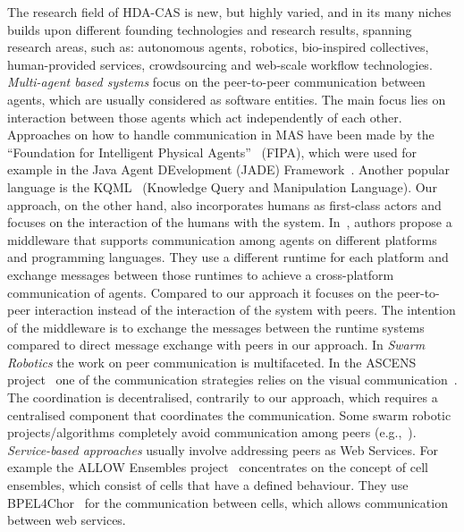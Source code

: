 \documentclass{llncs}
\begin{document}
  The research field of HDA-CAS is new, but highly varied, and in its many niches builds upon different founding technologies and research results, spanning research areas, such as: autonomous agents, robotics, bio-inspired collectives, human-provided services, crowdsourcing and web-scale workflow technologies. 
  \emph{Multi-agent based systems} focus on the peer-to-peer communication between agents, which are usually considered as software entities. The main focus lies on interaction between those agents which act independently of each other. Approaches on how to handle communication in MAS have been made by the ``Foundation for Intelligent Physical Agents''~\cite{FIPA} (FIPA), which were used for example in the Java Agent DEvelopment (JADE) Framework~\cite{JADE}. Another popular language is the KQML~\cite{KQML} (Knowledge Query and Manipulation Language). 
  Our approach, on the other hand, also incorporates humans as first-class actors and focuses on the interaction of the humans with the system. 
  In~\cite{Cabri1}, authors propose a middleware that supports communication among agents on different platforms and programming languages. They use a different runtime for each platform and exchange messages between those runtimes to achieve a cross-platform communication of agents. Compared to our approach it focuses on the peer-to-peer interaction instead of the interaction of the system with peers. The intention of the middleware is to exchange the messages between the runtime systems compared to direct message exchange with peers in our approach.
  In \emph{Swarm Robotics} the work on peer communication is multifaceted. In the ASCENS project~\cite{Zambonelli} one of the communication strategies relies on the visual communication~\cite{VisualComm}. The coordination is decentralised, contrarily to our approach, which requires a centralised component that coordinates the communication. Some swarm robotic projects/algorithms completely avoid communication among peers (e.g.,~\cite{BEECLUST}).
  \emph{Service-based approaches} usually involve addressing peers as Web Services. For example the ALLOW Ensembles project~\cite{Andrikopoulos} concentrates on the concept of cell ensembles, which consist of cells that have a defined behaviour. They use BPEL4Chor~\cite{BPEL4Chor} for the communication between cells, which allows communication between web services. 
\end{document}
